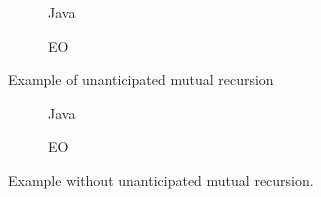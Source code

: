 \begin{figure}
    \centering
    \begin{subfigure}{0.4\textwidth}
        
        \caption{Java}
    \end{subfigure}
    \hfill
    \begin{subfigure}{0.4\textwidth}
        
        \caption{EO}
    \end{subfigure}
    \caption{Example of unanticipated mutual recursion}
    \label{fig:mutualrec_basic}
\end{figure}

\begin{figure}
    \centering
    \begin{subfigure}{0.4\textwidth}
        
        \caption{Java}
    \end{subfigure}
    \hfill
    \begin{subfigure}{0.4\textwidth}
        
        \caption{EO}
    \end{subfigure}
    \caption{Example without unanticipated mutual recursion.}
    \label{fig:oddeven}
\end{figure}

